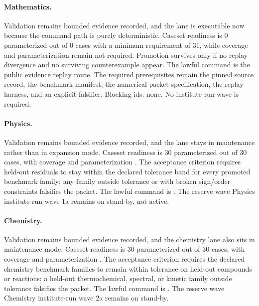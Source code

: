 \paragraph{Mathematics.}
Validation remains bounded evidence recorded, and the lane is executable now because the
command path is purely deterministic. Caseset readiness is 0 parameterized out
of 0 cases with a minimum requirement of 31, while coverage and parameterization
remain not required. Promotion survives only if no replay divergence
and no surviving counterexample appear. The lawful command is
the public evidence replay route. The
required prerequisites remain the pinned source record, the benchmark manifest,
the numerical packet specification, the replay harness, and an explicit
falsifier. Blocking ids: none. No institute-run wave is required.

\paragraph{Physics.}
Validation remains bounded evidence recorded, and the lane stays in maintenance rather than
in expansion mode. Caseset readiness is 30 parameterized out of 30 cases, with
coverage  and parameterization
. The acceptance criterion requires
held-out residuals to stay within the declared tolerance band for every
promoted benchmark family; any family outside tolerance or with broken
sign/order constraints falsifies the packet. The lawful command is
. The reserve wave
Physics institute-run wave 1a remains on stand-by, not active.

\paragraph{Chemistry.}
Validation remains bounded evidence recorded, and the chemistry lane also sits in
maintenance mode. Caseset readiness is 30 parameterized out of 30 cases, with
coverage  and parameterization
. The acceptance criterion requires
the declared chemistry benchmark families to remain within tolerance on
held-out compounds or reactions; a held-out thermochemical, spectral, or
kinetic family outside tolerance falsifies the packet. The lawful command is
. The reserve wave
Chemistry institute-run wave 2a remains on stand-by.

